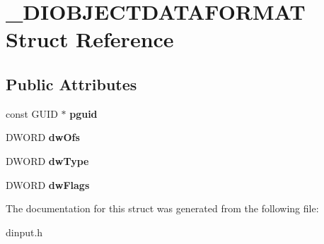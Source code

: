 \hypertarget{struct___d_i_o_b_j_e_c_t_d_a_t_a_f_o_r_m_a_t}{\section{\-\_\-\-D\-I\-O\-B\-J\-E\-C\-T\-D\-A\-T\-A\-F\-O\-R\-M\-A\-T Struct Reference}
\label{struct___d_i_o_b_j_e_c_t_d_a_t_a_f_o_r_m_a_t}
}
\subsection*{Public Attributes}
\begin{DoxyCompactItemize}
\item 
\hypertarget{struct___d_i_o_b_j_e_c_t_d_a_t_a_f_o_r_m_a_t_a1e45387fa97b685a690094aebbe12472}{const G\-U\-I\-D $\ast$ {\bfseries pguid}}\label{struct___d_i_o_b_j_e_c_t_d_a_t_a_f_o_r_m_a_t_a1e45387fa97b685a690094aebbe12472}

\item 
\hypertarget{struct___d_i_o_b_j_e_c_t_d_a_t_a_f_o_r_m_a_t_ad77e64009941d9461f4bad55fccd174f}{D\-W\-O\-R\-D {\bfseries dw\-Ofs}}\label{struct___d_i_o_b_j_e_c_t_d_a_t_a_f_o_r_m_a_t_ad77e64009941d9461f4bad55fccd174f}

\item 
\hypertarget{struct___d_i_o_b_j_e_c_t_d_a_t_a_f_o_r_m_a_t_a596ebf90f7f79d66c4a8e6a2da77fb04}{D\-W\-O\-R\-D {\bfseries dw\-Type}}\label{struct___d_i_o_b_j_e_c_t_d_a_t_a_f_o_r_m_a_t_a596ebf90f7f79d66c4a8e6a2da77fb04}

\item 
\hypertarget{struct___d_i_o_b_j_e_c_t_d_a_t_a_f_o_r_m_a_t_a5f31989c6f7b1b6b699434edbd0038be}{D\-W\-O\-R\-D {\bfseries dw\-Flags}}\label{struct___d_i_o_b_j_e_c_t_d_a_t_a_f_o_r_m_a_t_a5f31989c6f7b1b6b699434edbd0038be}

\end{DoxyCompactItemize}


The documentation for this struct was generated from the following file\-:\begin{DoxyCompactItemize}
\item 
dinput.\-h\end{DoxyCompactItemize}
